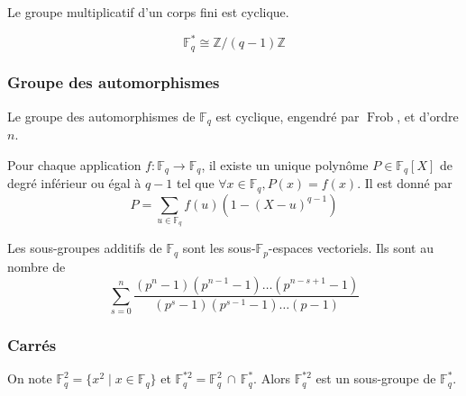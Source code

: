   \begin{corollary}
    Le groupe multiplicatif d'un corps fini est cyclique.
  \end{corollary}

  \begin{corollary}
    \[ \mathbb{F}_q^* \cong \mathbb{Z}/(q-1)\mathbb{Z} \]
  \end{corollary}

  \subsubsection{Groupe des automorphismes}

  \begin{theorem}
    Le groupe des automorphismes de $\mathbb{F}_q$ est cyclique, engendré par $\operatorname{Frob}$, et d'ordre $n$.
  \end{theorem}

  \begin{proposition}
    Pour chaque application $f : \mathbb{F}_q \rightarrow \mathbb{F}_q$, il existe un unique polynôme $P \in \mathbb{F}_q[X]$ de degré inférieur ou égal à $q-1$ tel que $\forall x \in \mathbb{F}_q, P(x)=f(x)$. Il est donné par
    \[ P = \sum_{u \in \mathbb{F}_q} f(u) (1 - (X-u)^{q-1}) \]
  \end{proposition}

  \begin{proposition}
    Les sous-groupes additifs de $\mathbb{F}_q$ sont les sous-$\mathbb{F}_p$-espaces vectoriels. Ils sont au nombre de
    \[ \sum_{s=0}^{n} \frac{(p^n-1) (p^{n-1}-1) \dots (p^{n-s+1}-1)}{(p^s-1) (p^{s-1}-1) \dots (p-1)} \]
  \end{proposition}

  \subsubsection{Carrés}


  \begin{proposition}
    On note $\mathbb{F}_q^2 = \{ x^2 \mid x \in \mathbb{F}_q \}$ et $\mathbb{F}_q^{*2} = \mathbb{F}_q^2 \, \cap \, \mathbb{F}_q^*$. Alors $\mathbb{F}_q^{*2}$ est un sous-groupe de $\mathbb{F}_q^*$.
  \end{proposition}

